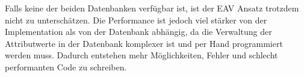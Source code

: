 Falls keine der beiden Datenbanken verfügbar ist, ist der EAV Ansatz trotzdem nicht zu unterschätzen. Die Performance ist jedoch viel stärker von der Implementation als von der Datenbank abhängig, da die Verwaltung der Attributwerte in der Datenbank komplexer ist und per Hand programmiert werden muss. Dadurch entstehen mehr Möglichkeiten, Fehler und schlecht performanten Code zu schreiben.



